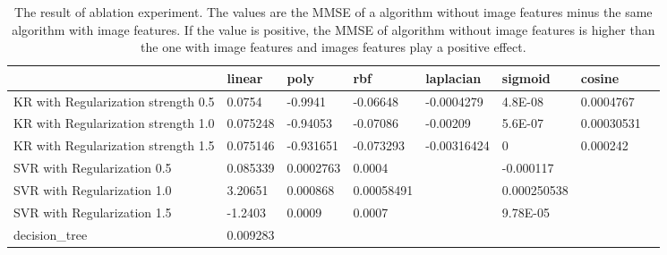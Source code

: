 \documentclass[final]{cvpr}
\begin{document}
\begin{table}[]
\begin{tabular}{|l|l|l|l|l|l|l|l|}
\hline
                                    & linear   & poly      & rbf        & laplacian   & sigmoid     & cosine     \\ \hline
KR with Regularization strength 0.5 & 0.0754   & -0.9941   & -0.06648   & -0.0004279  & 4.8E-08     & 0.0004767  \\ \hline
KR with Regularization strength 1.0 & 0.075248 & -0.94053  & -0.07086   & -0.00209    & 5.6E-07     & 0.00030531 \\ \hline
KR with Regularization strength 1.5 & 0.075146 & -0.931651 & -0.073293  & -0.00316424 & 0           & 0.000242   \\ \hline
SVR with Regularization 0.5         & 0.085339 & 0.0002763 & 0.0004     &             & -0.000117   &            \\ \hline
SVR with Regularization 1.0         & 3.20651  & 0.000868  & 0.00058491 &             & 0.000250538 &            \\ \hline
SVR with Regularization 1.5         & -1.2403  & 0.0009    & 0.0007     &             & 9.78E-05    &            \\ \hline
decision\_tree                      & 0.009283 &           &            &             &             &            \\ \hline
\end{tabular}
\caption{The result of ablation experiment. The values are the MMSE of a algorithm without image features minus the same algorithm with image features. If the value is positive, the MMSE of algorithm without image features is higher than the one with image features and images features play a positive effect.}
\label{tab:my-table21}
\end{table}
\end{document}
